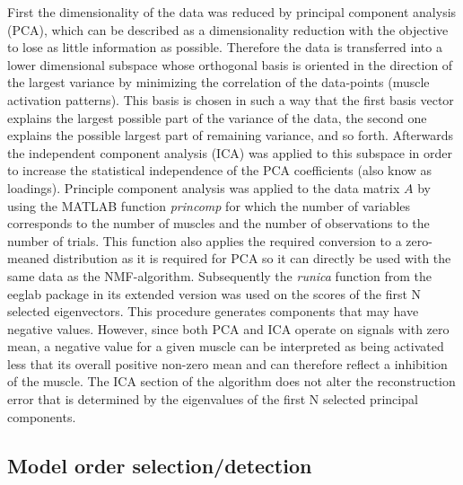 First the dimensionality of the data was reduced by principal component analysis (PCA), which can be described as a dimensionality reduction with the objective to lose as little information as possible. Therefore the data is transferred into a lower dimensional subspace whose orthogonal basis is oriented in the direction of the largest variance by minimizing the correlation of the data-points (muscle activation patterns). This basis is chosen in such a way that the first basis vector explains the largest possible part of the variance of the data, the second one explains the possible largest part of remaining variance, and so forth. Afterwards the independent component analysis (ICA) was applied to this subspace in order to increase the statistical independence of the PCA coefficients (also know as loadings). Principle component analysis was applied to the data matrix $A$ by using the MATLAB function \emph{princomp} for which the number of variables corresponds to the number of muscles and the number of observations to the number of trials. This function also applies the required conversion to a zero-meaned distribution as it is required for PCA so it can directly be used with the same data as the NMF-algorithm. Subsequently the \emph{runica} function from the eeglab package \citep{Delorme:2004p5081} in its extended version was used on the scores of the first N selected eigenvectors. 
This procedure generates components that may have negative values. However, since both PCA and ICA operate on signals with zero mean, a negative value for a given muscle can be interpreted as being activated less that its overall positive non-zero mean and can therefore reflect a inhibition of the muscle. The ICA section of the algorithm does not alter the reconstruction error that is determined by the eigenvalues of the first N selected principal components.

\subsection{Model order selection/detection} %
\label{sg:sub:model_order}

